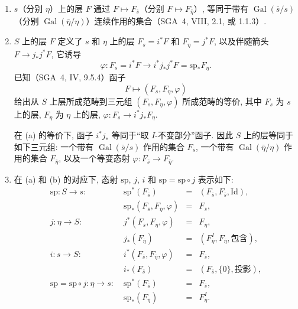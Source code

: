 \begin{enumerate}[label=(\alph*)]
\item $s$（分别 $\eta$）上的层 $F$ 通过 $F\mapsto F_{\bar s}$（分别 $F\mapsto F_{\bar\eta}$）, 等同于带有 $\operatorname{Gal}(\bar s/s)$（分别 $\operatorname{Gal}(\bar\eta/\eta)$）连续作用的集合（SGA~4, VIII, 2.1, 或 1.1.3）.

\item $S$ 上的层 $F$ 定义了 $s$ 和 $\eta$ 上的层 $F_s=i^*F$ 和 $F_\eta=j^*F$, 以及伴随箭头 $F\longrightarrow j_*j^*F$, 它诱导
\begin{equation*}
\varphi:F_s=i^*F\longrightarrow i^*j_*j^*F
=\mathrm{sp}_*F_\eta.
\end{equation*}
已知（SGA~4, IV, 9.5.4）函子
\begin{equation*}
F\longmapsto(F_s,F_\eta,\varphi)
\end{equation*}
给出从 $S$ 上层所成范畴到三元组 $(F_s,F_\eta,\varphi)$ 所成范畴的等价, 其中 $F_s$ 为 $s$ 上的层, $F_\eta$ 为 $\eta$ 上的层, $\varphi:F_s\longrightarrow i^*j_*F_\eta$.

在 (a) 的等价下, 函子 $i^*j_*$ 等同于“取 $I$-不变部分”函子. 因此 $S$ 上的层等同于如下三元组: 一个带有 $\operatorname{Gal}(\bar s/s)$ 作用的集合 $F_{\bar s}$, 一个带有 $\operatorname{Gal}(\bar\eta/\eta)$ 作用的集合 $F_{\bar\eta}$, 以及一个等变态射 $\varphi:F_{\bar s}\longrightarrow F_{\bar\eta}$.

\item 在 (a) 和 (b) 的对应下, 态射 $\mathrm{sp}$, $j$, $i$ 和 $\mathrm{sp}=\mathrm{sp}\circ j$ 表示如下:
\begin{equation*}
\begin{array}{llcl}
\mathrm{sp}:S\longrightarrow s:\;&
 \mathrm{sp}^*(F_{\bar s})&=&(F_{\bar s},F_{\bar s},\mathrm{Id}),\\[2pt]
&\mathrm{sp}_*(F_{\bar s},F_{\bar\eta},\varphi)&=&F_{\bar s},\\[3pt]
j:\eta\longrightarrow S:\;&
 j^*(F_{\bar s},F_{\bar\eta},\varphi)&=&F_{\bar\eta},\\[2pt]
&j_*(F_{\bar\eta})&=&(F_{\bar\eta}^{I},F_{\bar\eta},
 \text{包含}),\\[3pt]
i:s\longrightarrow S:\;&
 i^*(F_{\bar s},F_{\bar\eta},\varphi)&=&F_{\bar s},\\[2pt]
&i_*(F_{\bar s})&=&(F_{\bar s},\{0\},\text{投影}),\\[3pt]
\mathrm{sp}=\mathrm{sp}\circ j:\eta\longrightarrow s:\;&
 \mathrm{sp}^*(F_{\bar s})&=&F_{\bar s},\\[2pt]
&\mathrm{sp}_*(F_{\bar\eta})&=&F_{\bar\eta}^{I}.
\end{array}
\end{equation*}
\end{enumerate}

